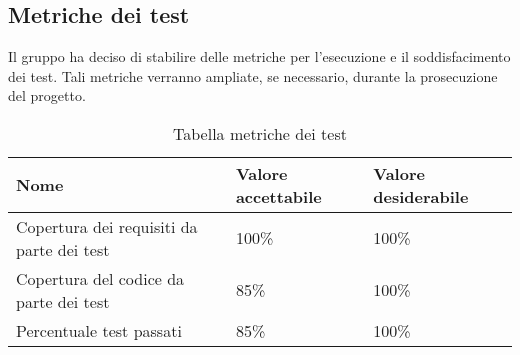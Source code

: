 \subsection{Metriche dei test}
Il gruppo ha deciso di stabilire delle metriche per l'esecuzione e il soddisfacimento dei test. Tali metriche verranno ampliate, se necessario, durante la prosecuzione del progetto.


{

\centering
\renewcommand{\arraystretch}{2}
\begin{longtable}{C{8.7cm} C{3cm} C{3cm}}
\caption{Tabella metriche dei test}\\
\textbf{Nome} &
\textbf{Valore accettabile}&
\textbf{Valore desiderabile}\\
\endhead


Copertura dei requisiti da parte dei test & 100\% & 100\%\\
Copertura del codice da parte dei test & 85\% & 100\%\\
Percentuale test passati & 85\% & 100\%\\


\end{longtable}
}
